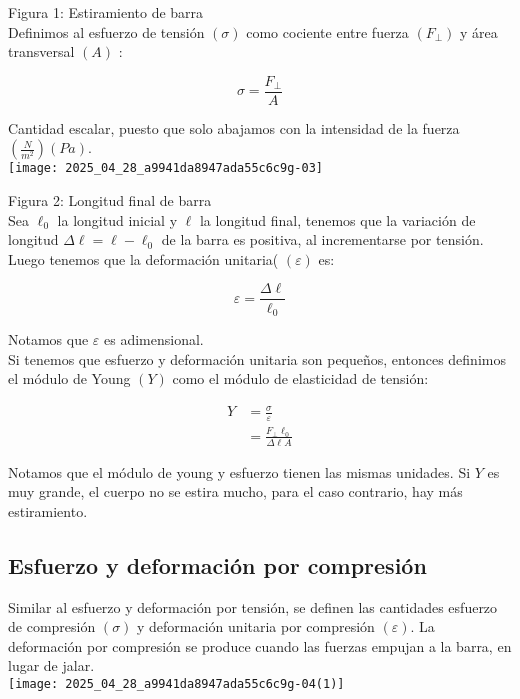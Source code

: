 Figura 1: Estiramiento de barra\\
Definimos al esfuerzo de tensión $(\sigma)$ como cociente entre fuerza $\left(F_{\perp}\right)$ y área transversal $(A)$ :


\begin{equation*}
\sigma=\frac{F_{\perp}}{A} \tag{2}
\end{equation*}


Cantidad escalar, puesto que solo abajamos con la intensidad de la fuerza $\left(\frac{N}{m^{2}}\right)(P a)$.\\
\texttt{[image: 2025\_04\_28\_a9941da8947ada55c6c9g-03]}

Figura 2: Longitud final de barra\\
Sea $\ell_{0}$ la longitud inicial y $\ell$ la longitud final, tenemos que la variación de longitud $\Delta \ell=\ell-\ell_{0}$ de la barra es positiva, al incrementarse por tensión. Luego tenemos que la deformación unitaria( $(\varepsilon)$ es:


\begin{equation*}
\varepsilon=\frac{\Delta \ell}{\ell_{0}} \tag{3}
\end{equation*}


Notamos que $\varepsilon$ es adimensional.\\
Si tenemos que esfuerzo y deformación unitaria son pequeños, entonces definimos el módulo de Young $(Y)$ como el módulo de elasticidad de tensión:

$$
\begin{aligned}
Y & =\frac{\sigma}{\varepsilon} \\
& =\frac{F_{\perp} \ell_{0}}{\Delta \ell A}
\end{aligned}
$$

Notamos que el módulo de young y esfuerzo tienen las mismas unidades. Si $Y$ es muy grande, el cuerpo no se estira mucho, para el caso contrario, hay más estiramiento.

\subsection{ Esfuerzo y deformación por compresión}
Similar al esfuerzo y deformación por tensión, se definen las cantidades esfuerzo de compresión $(\sigma)$ y deformación unitaria por compresión $(\varepsilon)$. La deformación por compresión se produce cuando las fuerzas empujan a la barra, en lugar de jalar.\\
\texttt{[image: 2025\_04\_28\_a9941da8947ada55c6c9g-04(1)]}

